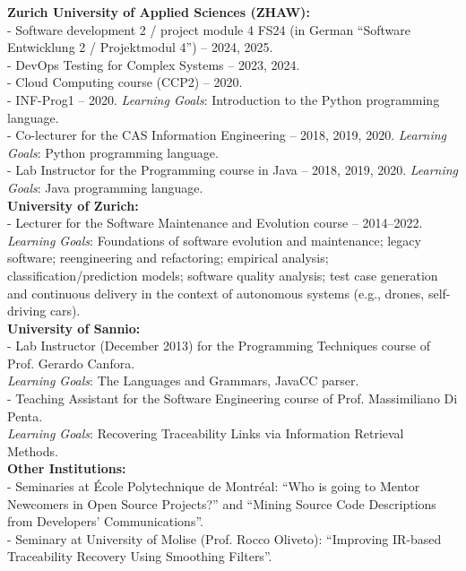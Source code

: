 \documentclass[11pt]{article}
\begin{document}
\textbf{Zurich University of Applied Sciences (ZHAW):}
\medskip \\
- Software development 2 / project module 4 FS24 (in German ``Software Entwicklung 2 / Projektmodul 4'') – 2024, 2025.\\
- DevOps Testing for Complex Systems – 2023, 2024.\\
- Cloud Computing course (CCP2) – 2020.\\
- INF-Prog1 – 2020. \textit{Learning Goals}: Introduction to the Python programming language.\\
- Co-lecturer for the CAS Information Engineering – 2018, 2019, 2020. \textit{Learning Goals}: Python programming language.\\
- Lab Instructor for the Programming course in Java – 2018, 2019, 2020. \textit{Learning Goals}: Java programming language.\\

\textbf{University of Zurich:}
\medskip \\
- Lecturer for the Software Maintenance and Evolution course – 2014–2022. \\
  \textit{Learning Goals}: Foundations of software evolution and maintenance; legacy software; reengineering and refactoring; empirical analysis; classification/prediction models; software quality analysis; test case generation and continuous delivery in the context of autonomous systems (e.g., drones, self-driving cars).\\

\textbf{University of Sannio:}
\medskip \\
- Lab Instructor (December 2013) for the Programming Techniques course of Prof. Gerardo Canfora.\\
  \textit{Learning Goals}: The Languages and Grammars, JavaCC parser.\\
- Teaching Assistant for the Software Engineering course of Prof. Massimiliano Di Penta.\\
  \textit{Learning Goals}: Recovering Traceability Links via Information Retrieval Methods.\\


\textbf{Other Institutions:}
\medskip \\
- Seminaries at École Polytechnique de Montréal: 
  ``Who is going to Mentor Newcomers in Open Source Projects?'' and 
  ``Mining Source Code Descriptions from Developers’ Communications''.\\
- Seminary at University of Molise (Prof. Rocco Oliveto): 
  ``Improving IR-based Traceability Recovery Using Smoothing Filters''.\\
\end{document}
